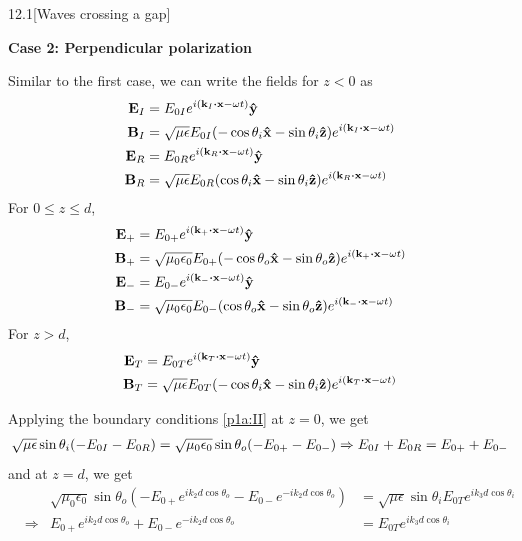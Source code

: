 \documentclass[12pt]{article}
\begin{document}
\begin{problem}{12.1}[Waves crossing a gap]
\begin{solution}
\begin{center}
\textbf{Case 2: Perpendicular polarization}
\end{center}
Similar to the first case, we can write the fields for $z<0$ as
\begin{subequations}
    \begin{align}
        \vb{E}_I&=E_{0I}e^{i(\vb{k}_I\vdot\vb{x}-\omega t)}\yhat\\
        \vb{B}_I&=\sqrt{\mu\epsilon}E_{0I}(-\cos\theta_i\xhat-\sin\theta_i\zhat)e^{i(\vb{k}_I\vdot\vb{x}-\omega
        t)}\\
        \vb{E}_R&=E_{0R}e^{i(\vb{k}_R\vdot\vb{x}-\omega t)}\yhat\\
        \vb{B}_R&=\sqrt{\mu\epsilon}E_{0R}(\cos\theta_i\xhat-\sin\theta_i\zhat)e^{i(\vb{k}_R\vdot\vb{x}-\omega
        t)}
    \end{align} 
\end{subequations}
For $0\leq z\leq d$,
\begin{subequations}
    \begin{align}
        \vb{E}_+&=E_{0+}e^{i(\vb{k}_+\vdot\vb{x}-\omega t)}\yhat\\
        \vb{B}_+&=\sqrt{\mu_0\epsilon_0}E_{0+}(-\cos\theta_o\xhat-\sin\theta_o\zhat)e^{i(\vb{k}_+\vdot\vb{x}-\omega
        t)}\\
        \vb{E}_-&=E_{0-}e^{i(\vb{k}_-\vdot\vb{x}-\omega t)}\yhat\\
        \vb{B}_-&=\sqrt{\mu_0\epsilon_0}E_{0-}(\cos\theta_o\xhat-\sin\theta_o\zhat)e^{i(\vb{k}_-\vdot\vb{x}-\omega
        t)}
    \end{align} 
\end{subequations}
For $z>d$,
\begin{subequations}
    \begin{align}
        \vb{E}_T&=E_{0T}e^{i(\vb{k}_T\vdot\vb{x}-\omega t)}\yhat\\
        \vb{B}_T&=\sqrt{\mu\epsilon}E_{0T}(-\cos\theta_i\xhat-\sin\theta_i\zhat)e^{i(\vb{k}_T\vdot\vb{x}-\omega
        t)}
    \end{align} 
\end{subequations}

Applying the boundary conditions \eqref{p1a:II} at $z=0$, we get
\begin{align}\label{p1a:5}
    \sqrt{\mu\epsilon}\sin\theta_i(-E_{0I}-E_{0R})=\sqrt{\mu_0\epsilon_0}\sin\theta_o\qty(-E_{0+}-E_{0-})\Rightarrow
    E_{0I}+E_{0R}=E_{0+}+E_{0-}
\end{align}
and at $z=d$, we get
\begin{align}\label{p1a:6}
    &&\sqrt{\mu_0\epsilon_0}\sin\theta_o(-E_{0+}e^{ik_2d\cos\theta_o}-E_{0-}e^{-ik_2d\cos\theta_o})
    &=\sqrt{\mu\epsilon}\sin\theta_iE_{0T}e^{ik_3d\cos\theta_i}\\
    &\Rightarrow&
    E_{0+}e^{ik_2d\cos\theta_o}+E_{0-}e^{-ik_2d\cos\theta_o}
    &=E_{0T}e^{ik_3d\cos\theta_i}
\end{align}


\end{solution}
\end{problem}
\end{document}
